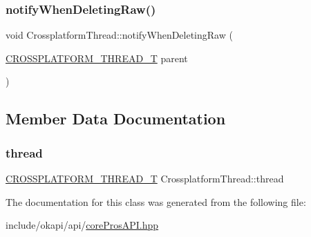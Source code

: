 \subsubsection{\texorpdfstring{notifyWhenDeletingRaw()}{notifyWhenDeletingRaw()}}
{\footnotesize\ttfamily void Crossplatform\+Thread\+::notify\+When\+Deleting\+Raw (\begin{DoxyParamCaption}\item[{\mbox{\hyperlink{coreProsAPI_8hpp_a1b1c38d4f3c04da38ebb34cb7dec488b}{C\+R\+O\+S\+S\+P\+L\+A\+T\+F\+O\+R\+M\+\_\+\+T\+H\+R\+E\+A\+D\+\_\+T}}}]{parent }\end{DoxyParamCaption})\hspace{0.3cm}{\ttfamily [inline]}}



\subsection{Member Data Documentation}
\mbox{\label{classCrossplatformThread_a6717570c6d2ecd9e1750d631594ae206}} 
\subsubsection{\texorpdfstring{thread}{thread}}
{\footnotesize\ttfamily \mbox{\hyperlink{coreProsAPI_8hpp_a1b1c38d4f3c04da38ebb34cb7dec488b}{C\+R\+O\+S\+S\+P\+L\+A\+T\+F\+O\+R\+M\+\_\+\+T\+H\+R\+E\+A\+D\+\_\+T}} Crossplatform\+Thread\+::thread}



The documentation for this class was generated from the following file\+:\begin{DoxyCompactItemize}
\item 
include/okapi/api/\mbox{\hyperlink{coreProsAPI_8hpp}{core\+Pros\+A\+P\+I.\+hpp}}\end{DoxyCompactItemize}
